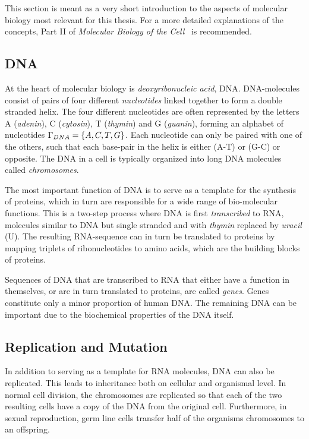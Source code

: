 This section is meant as a very short introduction to the aspects of molecular biology most relevant for this thesis.
For a more detailed explanations of the concepts, Part II of \emph{Molecular Biology of the Cell}~\cite{molbio} is recommended.

\subsection{DNA}
At the heart of molecular biology is \emph{deoxyribonucleic acid}, DNA.
DNA-molecules consist of pairs of four different \emph{nucleotides} linked together to form a double stranded helix.
The four different nucleotides are often represented by the letters A (\emph{adenin}), C (\emph{cytosin}), T (\emph{thymin}) and G (\emph{guanin}), forming an alphabet of nucleotides $\Gamma_{DNA} = \left\{A, C, T, G\right\}$.
Each nucleotide can only be paired with one of the others, such that each base-pair in the helix is either (A-T) or (G-C) or opposite. The DNA in a cell is typically organized into long DNA molecules called \emph{chromosomes}. 

The most important function of DNA is to serve as a template for the synthesis of proteins, which in turn are responsible for a wide range of bio-molecular functions.
This is a two-step process where DNA is first \emph{transcribed} to RNA, molecules similar to DNA but single stranded and with \emph{thymin} replaced by \emph{uracil} (U).
The resulting RNA-sequence can in turn be translated to proteins by mapping triplets of ribonucleotides to amino acids, which are the building blocks of proteins.

Sequences of DNA that are transcribed to RNA that either have a function in themselves, or are in turn translated to proteins, are called \emph{genes}.
Genes constitute only a minor proportion of human DNA.
The remaining DNA can be important due to the biochemical properties of the DNA itself. 


\subsection{Replication and Mutation}
In addition to serving as a template for RNA molecules, DNA can also be replicated.
This leads to inheritance both on cellular and organismal level.
In normal cell division, the chromosomes are replicated so that each of the two resulting cells have a copy of the DNA from the original cell.
Furthermore, in sexual reproduction, germ line cells transfer half of the organisms chromosomes to an offspring.

